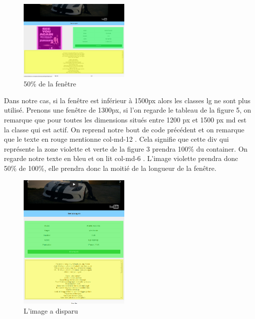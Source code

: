 \documentclass{article}
\begin{document}
\begin{figure}
  \vspace{-20pt}
  \begin{center}
    \includegraphics[width=0.48\textwidth]{p6}
  \end{center}
  \vspace{-20pt}
  \caption{50\% de la fen\^etre}
  \vspace{-10pt}
\end{figure} 

Dans notre cas, si la fen\^etre est inf\'erieur \`a 1500px alors les classes lg ne sont plus utilis\'e. Prenons une fen\^etre de 1300px, si l'on regarde le tableau de la figure 5, on remarque que pour toutes les dimensions situ\'es entre 1200 px et 1500 px md est la classe qui est actif. On reprend notre bout de code pr\'ec\'edent et on remarque que le texte en rouge mentionne \og col-md-12 \fg{}. Cela signifie que cette div qui repr\'esente la zone violette et verte de la figure 3 prendra 100\% du container. On regarde notre texte en bleu et on lit \og col-md-6 \fg{}. L'image violette prendra donc 50\% de 100\%, elle prendra donc la moiti\'e de la longueur de la fen\^etre.\\

\begin{figure}
  \vspace{-20pt}
  \begin{center}
    \includegraphics[width=0.48\textwidth]{p7}
  \end{center}
  \vspace{-20pt}
  \caption{L'image a disparu}
  \vspace{-10pt}
\end{figure} 
\end{document}
